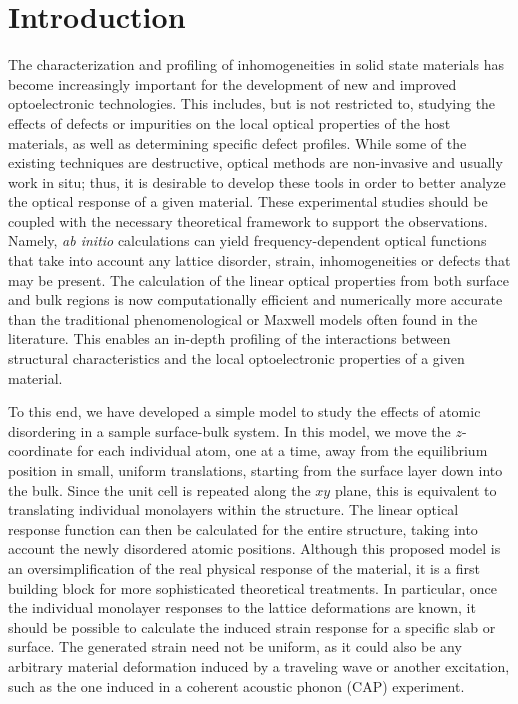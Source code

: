 \documentclass[pss]{wiley2sp} %
\begin{document}
\section{Introduction}\label{sec:intro}

The characterization and profiling of inhomogeneities in solid state materials
has become increasingly important for the development of new and improved
optoelectronic technologies. This includes, but is not restricted to, studying
the effects of defects or impurities on the local optical properties of the host
materials, as well as determining specific defect profiles. While some of the
existing techniques are destructive, optical methods are non-invasive and
usually work in situ; thus, it is desirable to develop these tools in order to
better analyze the optical response of a given material. These experimental
studies should be coupled with the necessary theoretical framework to support
the observations. Namely, \emph{ab initio} calculations can yield
frequency-dependent optical functions that take into account any lattice
disorder, strain, inhomogeneities or defects that may be present. The
calculation of the linear optical properties from both surface and bulk regions
\cite{hoganPRB98,palummoPRB99,hoganPRB03,mendozaPRB06,palummoPRB09,tancognePRB14,tancognePRB15}
is now computationally efficient and numerically more accurate than the
traditional phenomenological or Maxwell models often found in the literature.
This enables an in-depth profiling of the interactions between structural
characteristics and the local optoelectronic properties of a given material.

To this end, we have developed a simple model to study the effects of atomic
disordering in a sample surface-bulk system. In this model, we move the
$z$-coordinate for each individual atom, one at a time, away from the
equilibrium position in small, uniform translations, starting from the surface
layer down into the bulk. {\color{red}Since the unit cell is repeated along the
$xy$ plane, this is equivalent to translating individual monolayers within the
structure.} The linear optical response function can then be
calculated for the entire structure, taking into account the newly disordered
atomic positions. Although this proposed model is an oversimplification of the
real physical response of the material, it is a first building block for more
sophisticated theoretical treatments. In particular, once the individual
monolayer responses to the lattice deformations are known, it should be possible
to calculate the induced strain response for a specific slab or surface. The
generated strain need not be uniform, as it could also be any arbitrary material
deformation induced by a traveling wave or another excitation, such as the one
induced in a coherent acoustic phonon (CAP) experiment.
\end{document}
